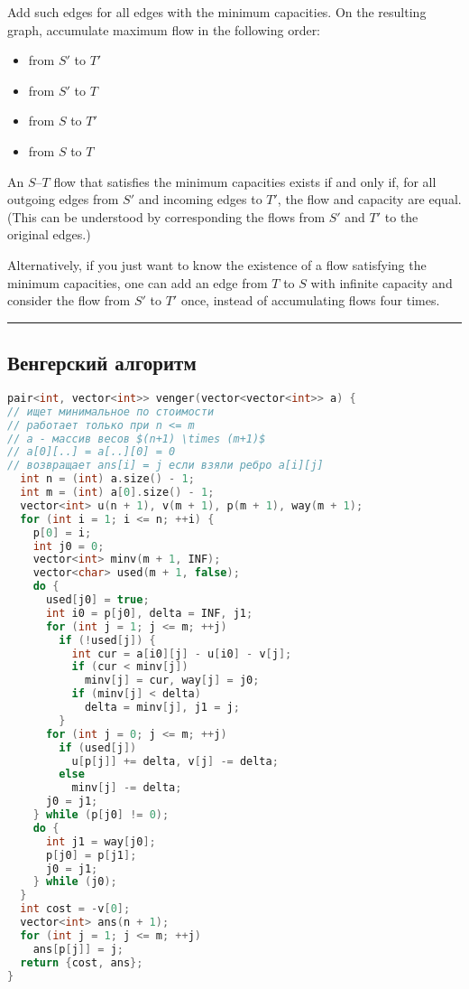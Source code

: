 \documentclass[9pt,a4paper,landscape,twosided]{extarticle}
\begin{document}
\begin{multicols*}{3}
Add such edges for all edges with the minimum capacities. On the resulting graph, accumulate maximum flow in the following order:

\begin{itemize}
    \item from $S'$ to $T'$
    \item from $S'$ to $T$
    \item from $S$ to $T'$
    \item from $S$ to $T$
\end{itemize}

An $S$--$T$ flow that satisfies the minimum capacities exists if and only if, for all outgoing edges from $S'$ and incoming edges to $T'$, the flow and capacity are equal. (This can be understood by corresponding the flows from $S'$ and $T'$ to the original edges.)

Alternatively, if you just want to know the existence of a flow satisfying the minimum capacities, one can add an edge from $T$ to $S$ with infinite capacity and consider the flow from $S'$ to $T'$ once, instead of accumulating flows four times.
\noindent\rule{\linewidth}{0.15mm}

\subsection{Венгерский алгоритм}
\begin{lstlisting}[language=C++]
pair<int, vector<int>> venger(vector<vector<int>> a) {
// ищет минимальное по стоимости
// работает только при n <= m
// a - массив весов $(n+1) \times (m+1)$
// a[0][..] = a[..][0] = 0
// возвращает ans[i] = j если взяли ребро a[i][j]
  int n = (int) a.size() - 1;
  int m = (int) a[0].size() - 1;
  vector<int> u(n + 1), v(m + 1), p(m + 1), way(m + 1);
  for (int i = 1; i <= n; ++i) {
    p[0] = i;
    int j0 = 0;
    vector<int> minv(m + 1, INF);
    vector<char> used(m + 1, false);
    do {
      used[j0] = true;
      int i0 = p[j0], delta = INF, j1;
      for (int j = 1; j <= m; ++j)
        if (!used[j]) {
          int cur = a[i0][j] - u[i0] - v[j];
          if (cur < minv[j])
            minv[j] = cur, way[j] = j0;
          if (minv[j] < delta)
            delta = minv[j], j1 = j;
        }
      for (int j = 0; j <= m; ++j)
        if (used[j])
          u[p[j]] += delta, v[j] -= delta;
        else
          minv[j] -= delta;
      j0 = j1;
    } while (p[j0] != 0);
    do {
      int j1 = way[j0];
      p[j0] = p[j1];
      j0 = j1;
    } while (j0);
  }
  int cost = -v[0];
  vector<int> ans(n + 1);
  for (int j = 1; j <= m; ++j)
    ans[p[j]] = j;
  return {cost, ans};
}
\end{lstlisting}


\end{multicols*}
\end{document}
